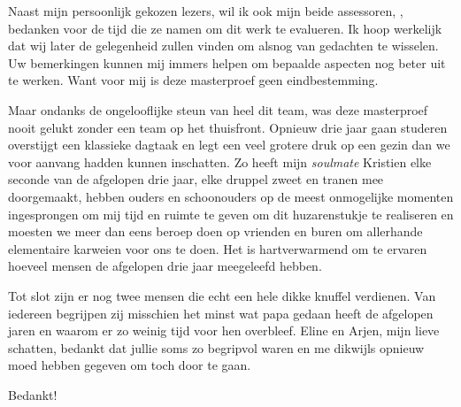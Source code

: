 \begin{preface}
Naast mijn persoonlijk gekozen lezers, wil ik ook mijn beide assessoren, \TODO,
bedanken voor de tijd die ze namen om dit werk te evalueren. Ik hoop werkelijk
dat wij later de gelegenheid zullen vinden om alsnog van gedachten te wisselen.
Uw bemerkingen kunnen mij immers helpen om bepaalde aspecten nog beter uit te
werken. Want voor mij is deze masterproef geen eindbestemming.

Maar ondanks de ongelooflijke steun van heel dit team, was deze masterproef
nooit gelukt zonder een team op het thuisfront. Opnieuw drie jaar gaan studeren
overstijgt een klassieke dagtaak en legt een veel grotere druk op een gezin dan
we voor aanvang hadden kunnen inschatten. Zo heeft mijn \emph{soulmate}
Kristien elke seconde van de afgelopen drie jaar, elke druppel zweet en tranen
mee doorgemaakt, hebben ouders en schoonouders op de meest onmogelijke momenten
ingesprongen om mij tijd en ruimte te geven om dit huzarenstukje te realiseren
en moesten we meer dan eens beroep doen op vrienden en buren om allerhande
elementaire karweien voor ons te doen. Het is hartverwarmend om te ervaren
hoeveel mensen de afgelopen drie jaar meegeleefd hebben.

Tot slot zijn er nog twee mensen die echt een hele dikke knuffel verdienen. Van
iedereen begrijpen zij misschien het minst wat papa gedaan heeft de afgelopen
jaren en waarom er zo weinig tijd voor hen overbleef. Eline en Arjen, mijn
lieve schatten, bedankt dat jullie soms zo begripvol waren en me dikwijls
opnieuw moed hebben gegeven om toch door te gaan.

\bigskip

Bedankt!

\end{preface}
